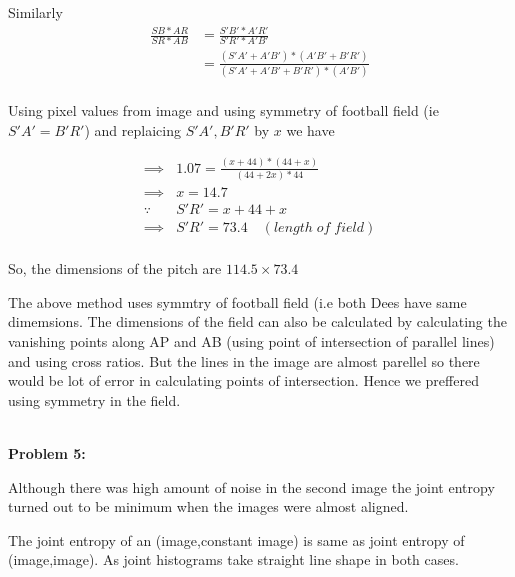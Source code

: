 \documentclass[a4paper]{article}
\begin{document}
Similarly
\begin{equation*} 
\begin{split}
 \frac{SB*AR}{SR*AB} &= \frac{S'B'*A'R'}{S'R'*A'B'} \\
\ &= \frac{(S'A'+A'B')*(A'B'+B'R')}{(S'A'+A'B'+B'R')*(A'B')} \\
 \end{split}
\end{equation*}

Using pixel values from image and using symmetry of football field (ie $S'A' = B'R'$) and replaicing $S'A',B'R'$ by $x$  we have

\begin{equation*} 
\begin{split}
\implies & 1.07 = \frac{(x+44)*(44+x)}{(44+2x)*44}\\
\implies & x = 14.7\\
\because \quad & S'R' = x+44+x \\
\implies & S'R' = 73.4 \quad (length \; of \; field)\\
 \end{split}
\end{equation*}

So, the dimensions of the pitch are $114.5 \times 73.4$

The above method uses symmtry of football field (i.e both Dees have same dimemsions. The dimensions of the field can also be calculated by calculating the vanishing points along AP and AB (using point of intersection of parallel lines) and using cross ratios. But the lines in the image are almost parellel so there would be lot of error in calculating points of intersection. Hence we preffered using symmetry in the field.

\hrulefill \\


\textbf{\newline Problem 5:}

Although there was high amount of noise in the second image the joint entropy turned out to be minimum when the images were almost aligned.

The joint entropy of an (image,constant image) is same as joint entropy of (image,image). As joint histograms take straight line shape in both cases.   
\end{document}
